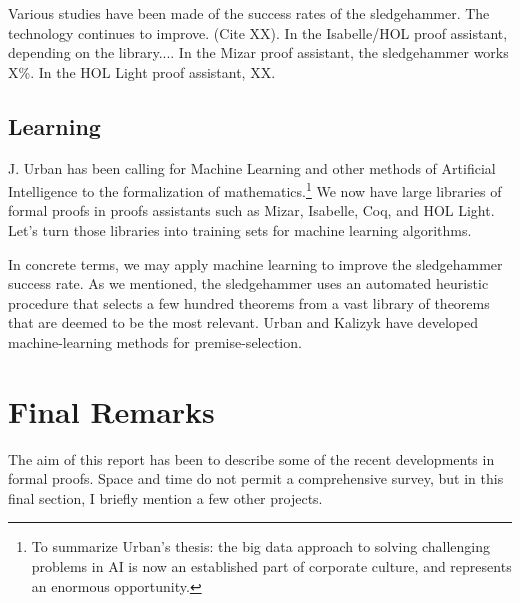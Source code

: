 \documentclass[brochure,english,12pt]{bourbaki}
\theoremstyle{plain}
\def\ring#1{{\mathbb{#1}}}
\begin{document}
Various studies have been made of the success rates of the sledgehammer.   The technology continues to improve.
(Cite XX).
In the Isabelle/HOL proof assistant, depending on the library....  In the Mizar proof assistant, the sledgehammer
works X\%.  In the HOL Light proof assistant, XX.

\subsection{Learning}

J. Urban has been calling for Machine Learning and other methods of Artificial Intelligence
to the formalization of mathematics.\footnote{To summarize Urban's thesis: the big data approach to solving
challenging problems in AI is now  an established part of corporate
culture, and represents an enormous opportunity.}
We now have large libraries of formal proofs in proofs assistants such
as Mizar, Isabelle, Coq, and HOL Light.  
Let's turn those libraries into training sets for machine learning algorithms.

In concrete terms, we may apply machine learning to improve the sledgehammer success rate.
As we mentioned, the sledgehammer uses an automated heuristic procedure that selects a few hundred
theorems from a vast library of theorems that are deemed to be the most relevant.   
Urban and Kalizyk have developed machine-learning methods for premise-selection.










\section{Final Remarks}

The aim of this report has been to describe some of the recent developments in formal proofs.
Space and time do not permit a comprehensive survey, but in this final section, I briefly mention
a few other projects.
\end{document}
